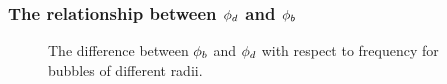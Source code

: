 










\subsubsection{The relationship between ${\phi_d}$ and ${\phi_b}$}


\begin{figure}
  \centering
  
  \caption{The difference between ${\phi_b}$ and ${\phi_d}$ with respect to frequency for bubbles of different radii.}
  \label{fig:DeltaPhi}
\end{figure}

